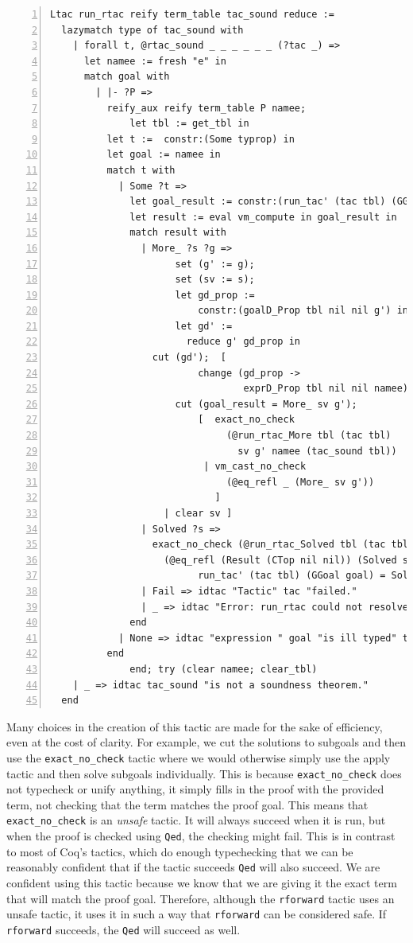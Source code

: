 \documentclass{puthesis}
\begin{document}
\begin{lstlisting}[numbers=left]
Ltac run_rtac reify term_table tac_sound reduce :=
  lazymatch type of tac_sound with
    | forall t, @rtac_sound _ _ _ _ _ _ (?tac _) =>
	  let namee := fresh "e" in
	  match goal with
	    | |- ?P => 
	      reify_aux reify term_table P namee;
              let tbl := get_tbl in
	      let t :=  constr:(Some typrop) in
	      let goal := namee in
	      match t with
	        | Some ?t =>
	          let goal_result := constr:(run_tac' (tac tbl) (GGoal namee)) in
	          let result := eval vm_compute in goal_result in
	          match result with
	            | More_ ?s ?g =>
                      set (g' := g);
                      set (sv := s);
                      let gd_prop := 
                          constr:(goalD_Prop tbl nil nil g') in
                      let gd' := 
                        reduce g' gd_prop in
	              cut (gd');  [ 
                          change (gd_prop -> 
                                  exprD_Prop tbl nil nil namee);
	                  cut (goal_result = More_ sv g');
                          [  exact_no_check
                               (@run_rtac_More tbl (tac tbl) 
                                 sv g' namee (tac_sound tbl))
                           | vm_cast_no_check 
                               (@eq_refl _ (More_ sv g'))
                             ] 
	                | clear sv ]
	            | Solved ?s =>
	              exact_no_check (@run_rtac_Solved tbl (tac tbl) s namee (tac_sound tbl) 
	                (@eq_refl (Result (CTop nil nil)) (Solved s) <:
                          run_tac' (tac tbl) (GGoal goal) = Solved s))
	            | Fail => idtac "Tactic" tac "failed."
	            | _ => idtac "Error: run_rtac could not resolve the result from the tactic :" tac
	          end
	        | None => idtac "expression " goal "is ill typed" t
	      end
              end; try (clear namee; clear_tbl)
	| _ => idtac tac_sound "is not a soundness theorem."
  end
\end{lstlisting}

Many choices in the creation of this tactic are made for the sake of
efficiency, even at the cost of clarity. For example, we cut the
solutions to subgoals and then use the
\lstinline|exact_no_check| tactic where we would otherwise simply use the apply
tactic and then solve subgoals individually. This is because
\lstinline|exact_no_check| does not typecheck or unify anything, it simply
fills in the proof with the provided term, not checking that the term
matches the proof goal. This means that \lstinline|exact_no_check| is
an \emph{unsafe} tactic. It will always succeed when it is run, but
when the proof is checked using \lstinline|Qed|, the checking might
fail. This is in contrast to most of Coq's tactics, which do enough
typechecking that we can be reasonably confident that if the tactic
succeeds \lstinline|Qed| will also succeed. We are confident using
this tactic because we know that we are giving it the exact term that
will match the proof goal. Therefore, although the \lstinline|rforward| tactic uses an unsafe
tactic, it uses it in such a way that \lstinline|rforward| can be
considered safe. If \lstinline|rforward| succeeds, the \lstinline|Qed| will succeed as
well.
\end{document}
